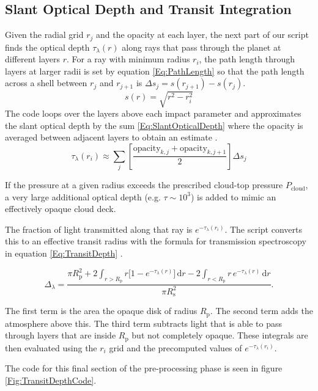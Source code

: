\documentclass{article}
\begin{document}
\subsection{Slant Optical Depth and Transit Integration}
\label{Section:SlantAndTransit}
Given the radial grid $r_j$ and the opacity at each layer, the next part of our script finds the optical depth $\tau_\lambda(r)$ along rays that pass through the planet at different layers $r$. 
For a ray with minimum radius $r_i$, the path length through layers at larger radii is set by equation \ref{Eq:PathLength} so that the path length across a shell between $r_j$ and $r_{j+1}$ is $\Delta s_j = s(r_{j+1}) - s(r_j)$.
\begin{equation}
s(r) = \sqrt{r^2 - r_i^2}
\label{Eq:PathLength}
\end{equation}
The code loops over the layers above each impact parameter and approximates the slant optical depth by the sum \ref{Eq:SlantOpticalDepth} where the opacity is averaged between adjacent layers to obtain an estimate \cite{Brown2001}.
\begin{equation}
	\tau_\lambda(r_i) \approx \sum_j \left[\frac{\mathrm{opacity}_{k,j} + \mathrm{opacity}_{k,j+1}}{2}\right] \Delta s_j
	\label{Eq:SlantOpticalDepth}
\end{equation}

If the pressure at a given radius exceeds the prescribed cloud-top pressure $P_\mathrm{cloud}$, a very large additional optical depth (e.g. $\tau\sim 10^3$) is added to mimic an effectively opaque cloud deck.

The fraction of light transmitted along that ray is $e^{-\tau_\lambda(r_i)}$.  The script converts this to an effective transit radius with the formula for transmission spectroscopy in equation \ref{Eq:TransitDepth} \cite{Seager2000,Brown2001}.

\begin{equation}
	\Delta_\lambda = \frac{\pi R_\mathrm{p}^2 + 2\int_{r>R_\mathrm{p}}  r \bigl[1 - e^{-\tau_\lambda(r)}\bigr]\,\mathrm{d}r 
	- 2\int_{r<R_\mathrm{p}} r\,e^{-\tau_\lambda(r)}\,\mathrm{d}r}{\pi R_\mathrm{s}^2}.
	\label{Eq:TransitDepth}
\end{equation}

The first term is the area the opaque disk of radius $ R_\mathrm{p} $. 
The second term adds the atmosphere above this.
The third term subtracts light that is able to pass through layers that are inside $ R_\mathrm{p} $ but not completely opaque.
These integrals are then evaluated using the $ r_i $ grid and the precomputed values of $ e^{-\tau_\lambda(r_i)} $.

The code for this final section of the pre-processing phase is seen in figure \ref{Fig:TransitDepthCode}.



\end{document}
